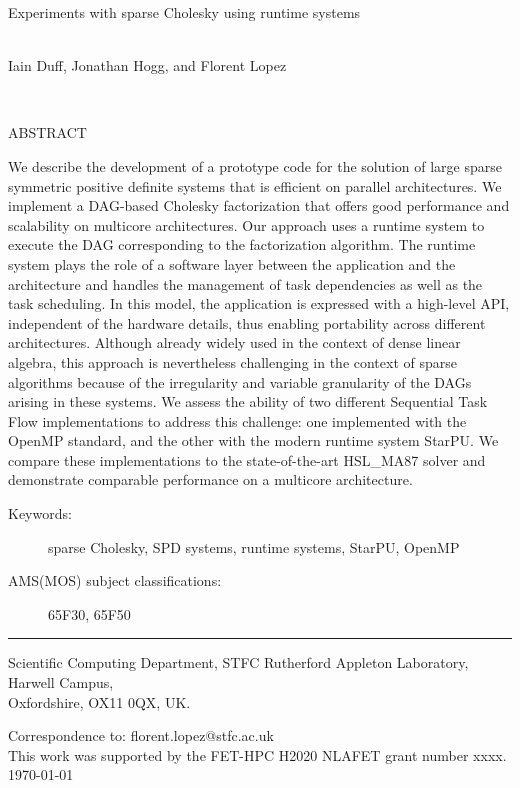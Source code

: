 \documentclass{article}
\newcommand{\starpu}{{StarPU}\xspace}
\newcommand{\openmp}{OpenMP\xspace}
\newcommand{\ma}{HSL\_MA87\xspace}
\newcommand{\stfccovertitle}
{Experiments with sparse Cholesky using runtime systems}
\newcommand{\theabstract}{We describe the development of a prototype
  code for the solution of large sparse symmetric positive definite
  systems that is efficient on parallel architectures. We implement a
  DAG-based Cholesky factorization that offers good performance and
  scalability on multicore architectures.  Our approach uses a runtime
  system to execute the DAG corresponding to the factorization
  algorithm. The runtime system plays the role of a software layer
  between the application and the architecture and handles the
  management of task dependencies as well as the task scheduling. In
  this model, the application is expressed with a high-level API,
  independent of the hardware details, thus enabling portability
  across different architectures. Although already widely used in the
  context of dense linear algebra, this approach is nevertheless
  challenging in the context of sparse algorithms because of the
  irregularity and variable granularity of the DAGs arising in these
  systems.  We assess the ability of two different Sequential Task
  Flow implementations to address this challenge: one implemented with
  the \openmp standard, and the other with the modern runtime system
  \starpu. We compare these implementations to the state-of-the-art
  \ma solver and demonstrate comparable performance on a multicore
  architecture. }
\begin{document}
\begin{titlepage}

\vspace*{-0.5cm}

\vspace{1.0 cm}

{\Large \bf
\begin{center}
   \stfccovertitle
\end{center}}

\begin{center}
\mbox{} \\
      Iain Duff, 
      Jonathan Hogg, and Florent Lopez
     
\mbox{} \\
\end{center}

\vspace{1.0cm}


\noindent
{\large ABSTRACT}

\vspace{0.3cm}
\noindent
\theabstract

\vspace{0.6cm}

\begin{description}
\item [Keywords:] sparse Cholesky, SPD systems, runtime systems, \starpu, \openmp
\item [AMS(MOS) subject classifications:]  65F30, 65F50
\end{description}

\vspace{0.1 cm}

\noindent \rule{15cm}{0.001in}
\vspace{0.1 cm}

\begin{description}

\item Scientific Computing Department, STFC Rutherford Appleton
  Laboratory, Harwell Campus,\\ Oxfordshire, OX11 0QX, UK.
\end{description}
\noindent
Correspondence to: florent.lopez@stfc.ac.uk\\
This work was supported by the FET-HPC H2020 NLAFET grant number xxxx.\\


\vspace{1.1 cm}
\noindent \today

\end{titlepage}
\end{document}
